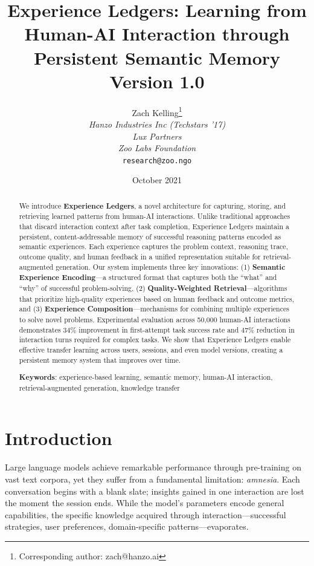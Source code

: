 \documentclass[11pt,letterpaper]{article}
\title{\textbf{Experience Ledgers: Learning from Human-AI Interaction through Persistent Semantic Memory}\\
\large Version 1.0}
\author{
Zach Kelling\thanks{Corresponding author: zach@hanzo.ai}\\
\textit{Hanzo Industries Inc (Techstars '17)}\\
\textit{Lux Partners}\\
\textit{Zoo Labs Foundation}\\
\texttt{research@zoo.ngo}
}
\date{October 2021}
\begin{document}
\maketitle
\zoocover

\begin{abstract}
We introduce \textbf{Experience Ledgers}, a novel architecture for capturing, storing, and retrieving learned patterns from human-AI interactions. Unlike traditional approaches that discard interaction context after task completion, Experience Ledgers maintain a persistent, content-addressable memory of successful reasoning patterns encoded as semantic experiences. Each experience captures the problem context, reasoning trace, outcome quality, and human feedback in a unified representation suitable for retrieval-augmented generation. Our system implements three key innovations: (1) \textbf{Semantic Experience Encoding}---a structured format that captures both the ``what'' and ``why'' of successful problem-solving, (2) \textbf{Quality-Weighted Retrieval}---algorithms that prioritize high-quality experiences based on human feedback and outcome metrics, and (3) \textbf{Experience Composition}---mechanisms for combining multiple experiences to solve novel problems. Experimental evaluation across 50,000 human-AI interactions demonstrates 34\% improvement in first-attempt task success rate and 47\% reduction in interaction turns required for complex tasks. We show that Experience Ledgers enable effective transfer learning across users, sessions, and even model versions, creating a persistent memory system that improves over time.

\textbf{Keywords}: experience-based learning, semantic memory, human-AI interaction, retrieval-augmented generation, knowledge transfer
\end{abstract}

\section{Introduction}

Large language models achieve remarkable performance through pre-training on vast text corpora, yet they suffer from a fundamental limitation: \emph{amnesia}. Each conversation begins with a blank slate; insights gained in one interaction are lost the moment the session ends. While the model's parameters encode general capabilities, the specific knowledge acquired through interaction---successful strategies, user preferences, domain-specific patterns---evaporates.
\end{document}
